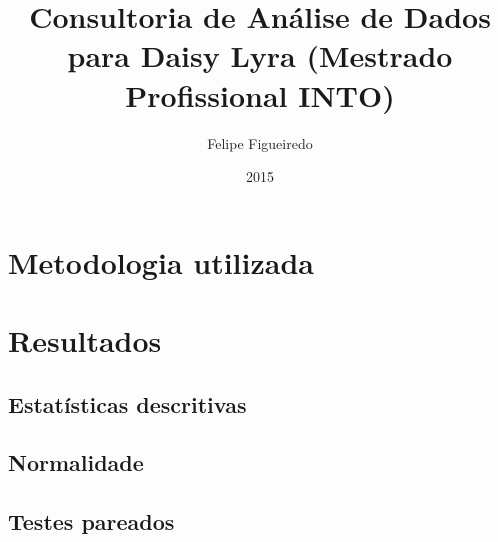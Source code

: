 \documentclass[a4paper]{article}
\author{Felipe Figueiredo}
\title{Consultoria de Análise de Dados para Daisy Lyra (Mestrado Profissional INTO)}
\date{2015}
\begin{document}
\maketitle
\tableofcontents

\section{Metodologia utilizada}

\section{Resultados}

\subsection{Estatísticas descritivas}


\subsection{Normalidade}

\subsection{Testes pareados}
\end{document}
